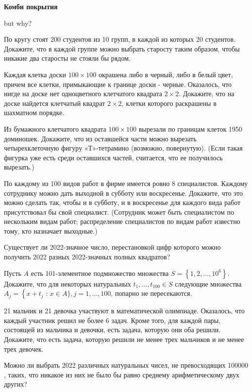 \centerline{\bf \Huge Комби покрытия}

\begin{flushright}
        \scriptsize{but why?}
\end{flushright}

По кругу стоят 200 студентов из 10 групп, в каждой из которых 20 студентов. Докажите, что в каждой группе можно выбрать старосту таким образом, чтобы никакие два старосты не стояли бы рядом.

Каждая клетка доски $100 \times 100$ окрашена либо в черный, либо в белый цвет, причем все клетки, примыкающие к границе доски - черные. Оказалось, что нигде на доске нет одноцветного клетчатого квадрата $2 \times 2$. Докажите, что на доске найдется клетчатый квадрат $2 \times 2$, клетки которого раскрашены в шахматном порядке.

Из бумажного клетчатого квадрата $100 \times 100$ вырезали по границам клеток 1950 доминошек. Докажите, что из оставшейся части можно вырезать четырехклеточную фигуру «Т»-тетрамино (возможно, повернутую). (Если такая фигурка уже есть среди оставшихся частей, считается, что ее получилось вырезать.)

По каждому из 100 видов работ в фирме имеется ровно 8 специалистов. Каждому сотруднику можно дать выходной в субботу или воскресенье. Докажите, что это можно сделать так, чтобы и в субботу, и в воскресенье для каждого вида работ присутствовал бы свой специалист. (Сотрудник может быть специалистом по нескольким видам работ; распределение специалистов по видам работ известно тому, кто назначает выходные.)

Существует ли 2022-значное число, перестановкой цифр которого можно получить 2022 разных 2022-значных полных квадратов?

Пусть $A$ есть 101-элементное подмножество множества $S=\left\{1,2, \ldots, 10^6\right\}$. Докажите, что для некоторых натуральных $t_1, \ldots, t_{100} \in S$ следующие множества $A_j=\left\{x+t_j\right.$ : $x \in A\}, j=1, \ldots, 100$, попарно не пересекаются.

21 мальчик и 21 девочка участвуют в математической олимпиаде. Оказалось, что каждый участник решил не более 6 задач. Кроме того, для каждой пары, состоящей из мальчика и девочки, есть задача, которую они оба решили. Докажите, что есть задача, которую решили не менее трех мальчиков и не менее трех девочек.

Можно ли выбрать 2022 различных натуральных чисел, не превосходящих 100000 , таких, что никакое из них не было бы равно среднему арифметическому двух других?